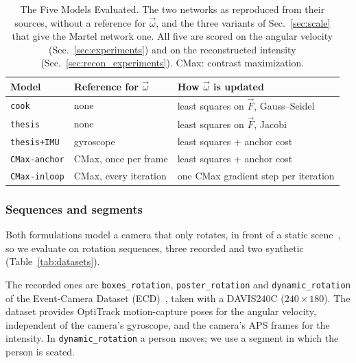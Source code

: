 \documentclass[journal]{IEEEtran}
\newcommand{\Fmap}{\vec{F}}
\newcommand{\wvec}{\vec{\omega}}
\begin{document}
\begin{table}[!t]
\renewcommand{\arraystretch}{1.2}
\caption{The Five Models Evaluated. \textnormal{The two networks as reproduced
from their sources, without a reference for $\wvec$, and the three variants of
Sec.~\ref{sec:scale} that give the Martel network one. All five are scored on
the angular velocity (Sec.~\ref{sec:experiments}) and on the reconstructed
intensity (Sec.~\ref{sec:recon_experiments}). CMax: contrast maximization.}}
\label{tab:models}
\centering
\footnotesize
\begin{tabular}{@{}>{\raggedright\arraybackslash}p{}
>{\raggedright\arraybackslash}p{}
>{\raggedright\arraybackslash}p{}@{}}
\toprule
Model & Reference for $\wvec$ & How $\wvec$ is updated \\
\midrule
\texttt{cook} & none & least squares on $\Fmap$, Gauss--Seidel \\
\texttt{thesis} & none & least squares on $\Fmap$, Jacobi \\
\texttt{thesis+IMU} & gyroscope & least squares + anchor cost \\
\texttt{CMax-anchor} & CMax, once per frame & least squares + anchor cost \\
\texttt{CMax-inloop} & CMax, every iteration & one CMax gradient step per iteration \\
\bottomrule
\end{tabular}
\end{table}

\subsubsection{Sequences and segments}
\label{sec:segments}
Both formulations model a camera that only rotates, in front of a static scene~\cite{cook2011,martel2015relational,martel2019thesis}, so we evaluate on rotation sequences, three recorded and two synthetic (Table~\ref{tab:datasets}).

The recorded ones are \texttt{boxes\_rotation}, \texttt{poster\_rotation} and \texttt{dynamic\_rotation} of the Event-Camera Dataset (ECD)~\cite{mueggler2017}, taken with a DAVIS240C ($240\times180$). The dataset provides OptiTrack motion-capture poses for the angular velocity, independent of the camera's gyroscope, and the camera's APS frames for the intensity. In \texttt{dynamic\_rotation} a person moves; we use a segment in which the person is seated.
\end{document}
